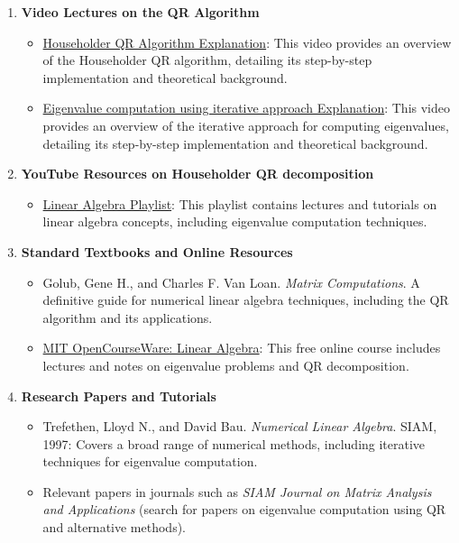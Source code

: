 \documentclass[12pt]{article}
\begin{document}
\begin{enumerate}
    \item \textbf{Video Lectures on the QR Algorithm}
    \begin{itemize}
        \item \href{https://youtu.be/pOiOH3yESPM?si=aDqNwa7yemUeFxbM}{Householder QR Algorithm Explanation}: This video provides an overview of the Householder QR algorithm, detailing its step-by-step implementation and theoretical background.
    \end{itemize}
    \begin{itemize}
        \item \href{https://youtu.be/d32WV1rKoVk?si=NJuQEwiSdjohx0Zf}{Eigenvalue computation using iterative approach Explanation}: This video provides an overview of the iterative approach for computing eigenvalues, detailing its step-by-step implementation and theoretical background.
    \end{itemize}
	
    \item \textbf{YouTube Resources on Householder QR decomposition}
    \begin{itemize}
        \item \href{https://youtube.com/playlist?list=PLxKgD50sMRvBHxvNPnGQ1kEHlO5y7mSnh&si=-t8-K6JNHG8CjlA5}{Linear Algebra Playlist}: This playlist contains lectures and tutorials on linear algebra concepts, including eigenvalue computation techniques.
    \end{itemize}

    \item \textbf{Standard Textbooks and Online Resources}
    \begin{itemize}
        \item Golub, Gene H., and Charles F. Van Loan. \textit{Matrix Computations}. A definitive guide for numerical linear algebra techniques, including the QR algorithm and its applications.
        \item \href{https://ocw.mit.edu/courses/mathematics/18-06-linear-algebra-spring-2010/}{MIT OpenCourseWare: Linear Algebra}: This free online course includes lectures and notes on eigenvalue problems and QR decomposition.
    \end{itemize}

    \item \textbf{Research Papers and Tutorials}
    \begin{itemize}
        \item Trefethen, Lloyd N., and David Bau. \textit{Numerical Linear Algebra}. SIAM, 1997: Covers a broad range of numerical methods, including iterative techniques for eigenvalue computation.
        \item Relevant papers in journals such as \textit{SIAM Journal on Matrix Analysis and Applications} (search for papers on eigenvalue computation using QR and alternative methods).
    \end{itemize}
\end{enumerate}
\end{document}
